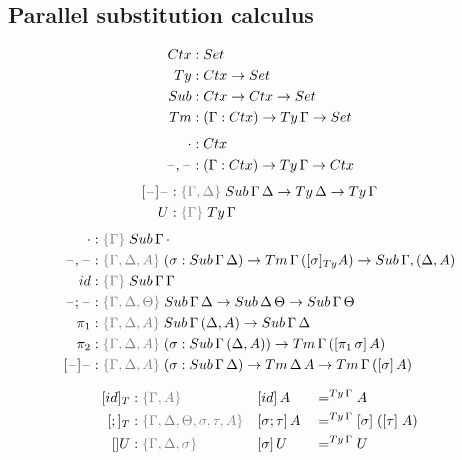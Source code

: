\documentclass[a4paper,UKenglish,numberwithinsect,cleveref,thm-restate]{lipics-v2021}
\begin{document}
\subsection{Parallel substitution calculus} \label{subsec:SC}
\begin{alignat*}{3}
  \Ctx   & : \Set                   \\
  \Ty    & : \Ctx \to \Set          \\
  \Sub   & : \Ctx \to \Ctx \to \Set \\
  \Tm    & : (\Gamma : \Ctx) \to \Ty\,\Gamma \to \Set
\end{alignat*}
\begin{alignat*}{3}
  \emptyctx & : \Ctx \\
  \blank,\blank & : (\Gamma : \Ctx) \to \Ty\,\Gamma \to \Ctx
\end{alignat*}
\begin{alignat*}{3}
  [\blank]\blank &: \implicit{\Gamma, \Delta} \; \Sub\,\Gamma\,\Delta \to \Ty\,\Delta \to \Ty\,\Gamma \\
  U & : \implicit{\Gamma}\;\Ty\, \Gamma
\end{alignat*}
\begin{alignat*}{3}
  \emptysub & : \implicit{\Gamma}\;\Sub\,\Gamma\,\emptyctx \\
  \blank,\blank & : \implicit{\Gamma, \Delta, A}\;(\sigma : \Sub\,\Gamma\,\Delta) \to \Tm\,\Gamma\,([ \sigma ]_{\Ty} A) \to \Sub\,\Gamma,(\Delta, A) \\
  \idS & : \implicit{\Gamma}\;\Sub\,\Gamma\,\Gamma \\
  \blank;\blank & : \implicit{\Gamma, \Delta, \Theta}\;\Sub\,\Gamma\,\Delta \to \Sub\,\Delta\,\Theta \to \Sub\,\Gamma\,\Theta \\
  \pi_1 & : \implicit{\Gamma, \Delta, A}\;\Sub\,\Gamma\,(\Delta, A) \to \Sub\,\Gamma\,\Delta \\
  \pi_2 & : \implicit{\Gamma, \Delta, A}\;(\sigma : \Sub\,\Gamma\,(\Delta, A)) \to \Tm\,\Gamma\,([ \pi_1\,\sigma ]\, A) \\
  [\blank] \blank & : \implicit{\Gamma,\Delta, A}\;(\sigma : \Sub\,\Gamma\,\Delta) \to \Tm\,\Delta\,A \to \Tm\,\Gamma\,([\sigma]\, A)
\end{alignat*}


\begin{alignat*}{3}
  [\idS]_T & : \implicit{\Gamma, A}                               && [ \idS ] \,A         && =^{\Ty\,\Gamma} A \\
  [;]_T    & : \implicit{\Gamma, \Delta, \Theta, \sigma, \tau, A} && [ \sigma ; \tau ]\,A && =^{\Ty\,\Gamma} [ \sigma ]\;([ \tau ]\;A) \\
  []U      & : \implicit{\Gamma, \Delta, \sigma}                  && [ \sigma ]\,U        && =^{\Ty\,\Gamma} U
\end{alignat*}
\end{document}

